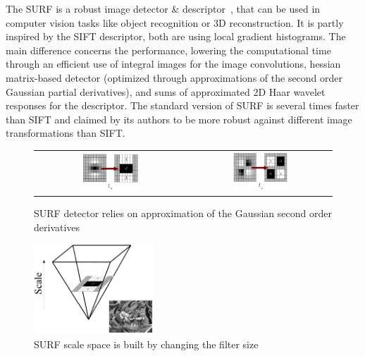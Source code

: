The \gls{SURF} is a robust image detector \& descriptor~\cite{surf}, that can be used in computer vision tasks like object recognition or 3D reconstruction. It is partly inspired by the \gls{SIFT} descriptor, both are using local gradient histograms. The main difference concerns the performance, lowering the computational time through an efficient use of integral images for the image convolutions, hessian matrix-based detector (optimized through approximations of the second order Gaussian partial derivatives), and sums of approximated 2D Haar wavelet responses for the descriptor. The standard version of \gls{SURF} is several times faster than \gls{SIFT} and claimed by its authors to be more robust against different image transformations than \gls{SIFT}.

\begin{figure}[H]
\centering
 \begin{tabular}{cc}
 \includegraphics[width=0.4\textwidth]{figures/surf_lyy} &
 \includegraphics[width=0.4\textwidth]{figures/surf_lxy}
 \end{tabular}
\caption{SURF detector relies on approximation of the Gaussian second order derivatives}
\end{figure}

\begin{figure}[H]
\centering
\includegraphics[width=0.4\textwidth]{figures/surf_scale}
\caption{SURF scale space is built by changing the filter size}
\end{figure}

